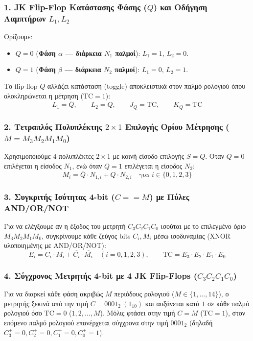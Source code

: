 \documentclass[11pt, a4paper]{article}
\begin{document}
\subsubsection*{1. JK Flip-Flop Κατάστασης Φάσης ($Q$) και Οδήγηση Λαμπτήρων $L_1, L_2$}
Ορίζουμε:
\begin{itemize}[leftmargin=1.5em, noitemsep]
    \item $Q = 0$ (\textbf{Φάση $\alpha$ --- διάρκεια $N_1$ παλμοί}): $L_1 = 1, \, L_2 = 0$.
    \item $Q = 1$ (\textbf{Φάση $\beta$ --- διάρκεια $N_2$ παλμοί}): $L_1 = 0, \, L_2 = 1$.
\end{itemize}
Το flip-flop $Q$ αλλάζει κατάσταση (toggle) αποκλειστικά στον παλμό ρολογιού όπου ολοκληρώνεται η μέτρηση ($\text{TC} = 1$):
\[
\boxed{L_1 = \overline{Q}, \qquad L_2 = Q, \qquad J_Q = \text{TC}, \qquad K_Q = \text{TC}}
\]

\subsubsection*{2. Τετραπλός Πολυπλέκτης $2\times 1$ Επιλογής Ορίου Μέτρησης ($M = M_3 M_2 M_1 M_0$)}
Χρησιμοποιούμε $4$ πολυπλέκτες $2\times 1$ με κοινή είσοδο επιλογής $S = Q$. Όταν $Q = 0$ επιλέγεται η είσοδος $N_1$, ενώ όταν $Q = 1$ επιλέγεται η είσοδος $N_2$:
\[
\boxed{M_i = \overline{Q} \cdot N_{1,i} + Q \cdot N_{2,i} \quad \text{για } i \in \{0, 1, 2, 3\}}
\]

\subsubsection*{3. Συγκριτής Ισότητας 4-bit ($C == M$) με Πύλες AND/OR/NOT}
Για να ελέγξουμε αν η έξοδος του μετρητή $C_3 C_2 C_1 C_0$ ισούται με το επιλεγμένο όριο $M_3 M_2 M_1 M_0$, συγκρίνουμε κάθε ζεύγος bits $C_i, M_i$ μέσω ισοδυναμίας (XNOR υλοποιημένης με AND/OR/NOT):
\[
\boxed{E_i = C_i \cdot M_i + \overline{C_i} \cdot \overline{M_i} \quad (i = 0, 1, 2, 3), \qquad \text{TC} = E_3 \cdot E_2 \cdot E_1 \cdot E_0}
\]

\subsubsection*{4. Σύγχρονος Μετρητής 4-bit με 4 JK Flip-Flops ($C_3 C_2 C_1 C_0$)}
Για να διαρκεί κάθε φάση ακριβώς $M$ περιόδους ρολογιού ($M \in \{1, \dots, 14\}$), ο μετρητής ξεκινά από την τιμή $C = 0001_2 \ (1_{10})$ και αυξάνεται κατά $1$ σε κάθε παλμό ρολογιού όσο $\text{TC} = 0$ ($1, 2, \dots, M$). Μόλις φτάσει στην τιμή $C = M$ ($\text{TC} = 1$), στον επόμενο παλμό ρολογιού επανέρχεται σύγχρονα στην τιμή $0001_2$ (δηλαδή $C_3^+ = 0, C_2^+ = 0, C_1^+ = 0, C_0^+ = 1$).
\end{document}
